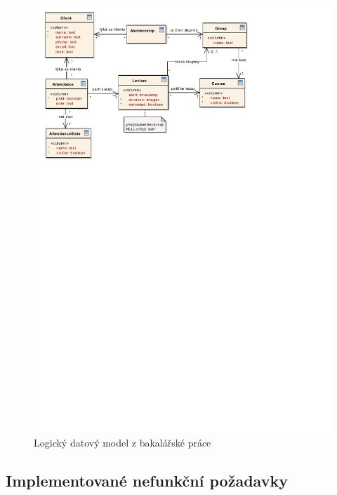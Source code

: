 \begin{figure}[h]\centering
	\includegraphics[width=1\textwidth]{img/bp/db-model}
	\caption[Logický datový model z bakalářské práce]{Logický datový model z bakalářské práce \cite{bp}}\label{fig:db-model}
\end{figure}

\subsection{Implementované nefunkční požadavky}

